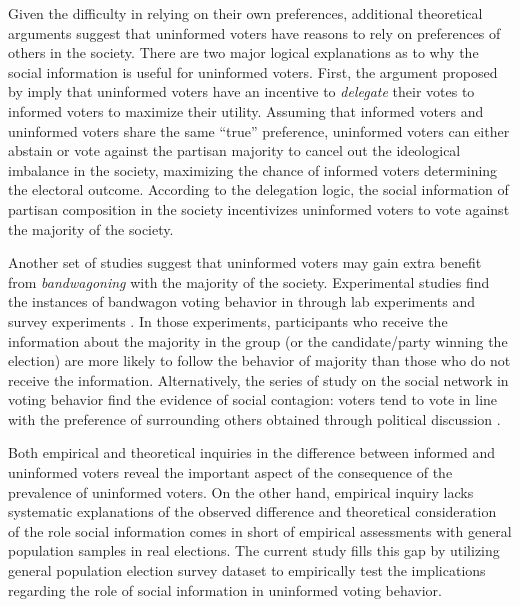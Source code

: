 \documentclass[doc,natbib,12pt]{apa6}\usepackage[]{graphicx}\usepackage[]{color}
\begin{document}
    \par Given the difficulty in relying on their own preferences, additional theoretical arguments suggest that uninformed voters have reasons to rely on preferences of others in the society. There are two major logical explanations as to why the social information is useful for uninformed voters. First, the argument proposed by \cite{Feddersen1996thsw} imply that uninformed voters have an incentive to \textit{delegate} their votes to informed voters to maximize their utility. Assuming that informed voters and uninformed voters share the same ``true'' preference, uninformed voters can either abstain or vote against the partisan majority to cancel out the ideological imbalance in the society, maximizing the chance of informed voters determining the electoral outcome. According to the delegation logic, the social information of partisan composition in the society incentivizes uninformed voters to vote against the majority of the society. 
    
    \par Another set of studies suggest that uninformed voters may gain extra benefit from \textit{bandwagoning} with the majority of the society. Experimental studies find the instances of bandwagon voting behavior in through lab experiments \citep{Bischoff2013soin, Morton2015whmo, Tyran2016exev} and survey experiments \citep{Roy2015anex,vanderMeer2016ofth, Dahlgaard2017hoel}. In those experiments, participants who receive the information about the majority in the group (or the candidate/party winning the election) are more likely to follow the behavior of majority than those who do not receive the information. Alternatively, the series of study on the social network in voting behavior find the evidence of social contagion: voters tend to vote in line with the preference of surrounding others obtained through political discussion \citep{Huckfeldt1987nein, Huckfeldt2014nobi, Huckfeldt1995cipo}.
    
    \par Both empirical and theoretical inquiries in the difference between informed and uninformed voters reveal the important aspect of the consequence of the prevalence of uninformed voters. On the other hand, empirical inquiry lacks systematic explanations of the observed difference and theoretical consideration of the role social information comes in short of empirical assessments with general population samples in real elections. The current study fills this gap by utilizing general population election survey dataset to empirically test the implications regarding the role of social information in uninformed voting behavior.   
    
\end{document}
